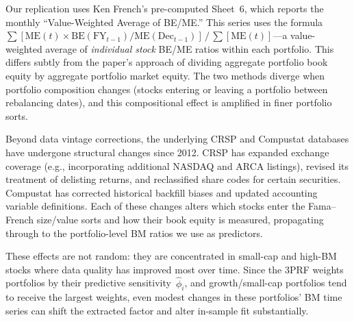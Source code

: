 \documentclass[10pt,letterpaper]{handout}
\begin{document}
\smallskip
Our replication uses Ken French's pre-computed Sheet~6, which reports the monthly ``Value-Weighted Average of BE/ME.'' This series uses the formula $\sum[\text{ME}(t) \times \text{BE}(\text{FY}_{t-1}) / \text{ME}(\text{Dec}_{t-1})] \,/\, \sum[\text{ME}(t)]$---a value-weighted average of \textit{individual stock} BE/ME ratios within each portfolio. This differs subtly from the paper's approach of dividing aggregate portfolio book equity by aggregate portfolio market equity. The two methods diverge when portfolio composition changes (stocks entering or leaving a portfolio between rebalancing dates), and this compositional effect is amplified in finer portfolio sorts.


Beyond data vintage corrections, the underlying CRSP and Compustat databases have undergone structural changes since 2012. CRSP has expanded exchange coverage (e.g., incorporating additional NASDAQ and ARCA listings), revised its treatment of delisting returns, and reclassified share codes for certain securities. Compustat has corrected historical backfill biases and updated accounting variable definitions. Each of these changes alters which stocks enter the Fama--French size/value sorts and how their book equity is measured, propagating through to the portfolio-level BM ratios we use as predictors.

\smallskip
These effects are not random: they are concentrated in small-cap and high-BM stocks where data quality has improved most over time. Since the 3PRF weights portfolios by their predictive sensitivity~$\hat{\phi}_i$, and growth/small-cap portfolios tend to receive the largest weights, even modest changes in these portfolios' BM time series can shift the extracted factor and alter in-sample fit substantially.
\end{document}
